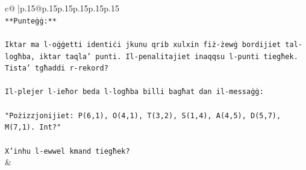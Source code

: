 \documentclass{article}
\begin{document}
{\begin{supertabular}{c@{$\;$}|p{.15\linewidth}@{}p{.15\linewidth}p{.15\linewidth}p{.15\linewidth}p{.15\linewidth}p{.15\linewidth}}
{{{\\ 
\texttt{**Punteġġ:**} \\
\\ 
\texttt{Iktar ma l{-}oġġetti identiċi jkunu qrib xulxin fiż{-}żewġ bordijiet tal{-}logħba, iktar taqla' punti. Il{-}penalitajiet inaqqsu l{-}punti tiegħek. Tista' tgħaddi r{-}rekord?} \\
\\ 
\texttt{Il{-}plejer l{-}ieħor beda l{-}logħba billi bagħat dan il{-}messaġġ:} \\
\\ 
\texttt{"Pożizzjonijiet: P(6,1), O(4,1), T(3,2), S(1,4), A(4,5), D(5,7), M(7,1). Int?"} \\
\\ 
\texttt{X'inhu l{-}ewwel kmand tiegħek?} \\
            }
        }
    }
    & \\ \\


\end{supertabular}}
\end{document}
